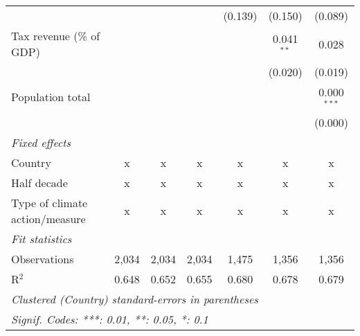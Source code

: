 \begin{tabular}{lcccccc}
                                                    &              &                &                & (0.139)        & (0.150)        & (0.089)\\   
   Tax revenue (\% of GDP)                          &              &                &                &                & 0.041$^{**}$   & 0.028\\   
                                                    &              &                &                &                & (0.020)        & (0.019)\\   
   Population total                                 &              &                &                &                &                & 0.000$^{***}$\\   
                                                    &              &                &                &                &                & (0.000)\\   
   \emph{Fixed effects}\\
   Country                                          & x            & x              & x              & x              & x              & x\\  
   Half decade                                      & x            & x              & x              & x              & x              & x\\  
   Type of climate action/measure                   & x            & x              & x              & x              & x              & x\\  
   \midrule \emph{Fit statistics}\\
   Observations                                     & 2,034        & 2,034          & 2,034          & 1,475          & 1,356          & 1,356\\  
   R$^2$                                            & 0.648        & 0.652          & 0.655          & 0.680          & 0.678          & 0.679\\  
   \midrule
   \multicolumn{7}{l}{\emph{Clustered (Country) standard-errors in parentheses}}\\
   \multicolumn{7}{l}{\emph{Signif. Codes: ***: 0.01, **: 0.05, *: 0.1}}\\
\end{tabular}
\par\endgroup


